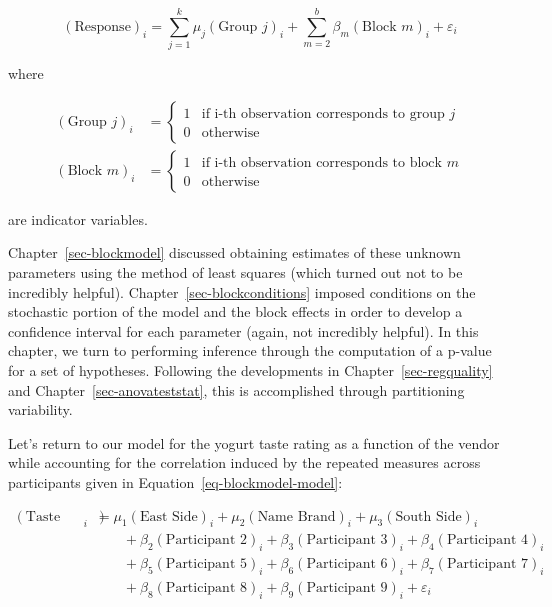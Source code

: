 \documentclass[
  letterpaper,
  DIV=11,
  numbers=noendperiod]{scrreprt}
\theoremstyle{plain}
\theoremstyle{definition}
\theoremstyle{definition}
\theoremstyle{remark}
\begin{document}
\[(\text{Response})_i = \sum_{j=1}^{k} \mu_j (\text{Group } j)_i + \sum_{m=2}^{b} \beta_m (\text{Block } m)_i + \varepsilon_i\]

where

\[
\begin{aligned}
  (\text{Group } j)_i 
    &= \begin{cases} 1 & \text{if i-th observation corresponds to group } j \\ 0 & \text{otherwise} \end{cases} \\
  (\text{Block } m)_i
    &= \begin{cases} 1 & \text{if i-th observation corresponds to block } m \\ 0 & \text{otherwise} \end{cases}
\end{aligned}
\]

are indicator variables.

Chapter~\ref{sec-blockmodel} discussed obtaining estimates of these
unknown parameters using the method of least squares (which turned out
not to be incredibly helpful). Chapter~\ref{sec-blockconditions} imposed
conditions on the stochastic portion of the model and the block effects
in order to develop a confidence interval for each parameter (again, not
incredibly helpful). In this chapter, we turn to performing inference
through the computation of a p-value for a set of hypotheses. Following
the developments in Chapter~\ref{sec-regquality} and
Chapter~\ref{sec-anovateststat}, this is accomplished through
partitioning variability.

Let's return to our model for the yogurt taste rating as a function of
the vendor while accounting for the correlation induced by the repeated
measures across participants given in
Equation~\ref{eq-blockmodel-model}:

\[
\begin{aligned}
  (\text{Taste Rating})_i &= \mu_1 (\text{East Side})_i + \mu_2 (\text{Name Brand})_i + \mu_3 (\text{South Side})_i \\
    &\qquad + \beta_2 (\text{Participant 2})_i + \beta_3 (\text{Participant 3})_i + \beta_4 (\text{Participant 4})_i \\
    &\qquad + \beta_5 (\text{Participant 5})_i + \beta_6 (\text{Participant 6})_i + \beta_7 (\text{Participant 7})_i \\
    &\qquad + \beta_8 (\text{Participant 8})_i + \beta_9 (\text{Participant 9})_i + \varepsilon_i
\end{aligned}
\]
\end{document}
